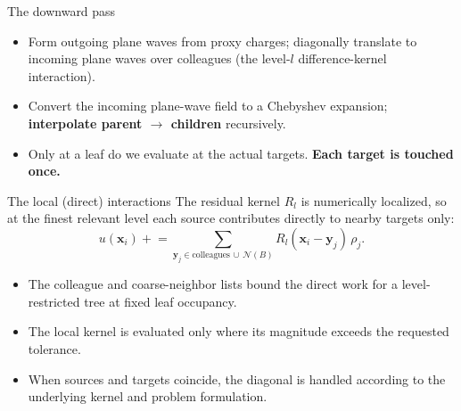 \documentclass[aspectratio=169,11pt]{beamer}
\newcommand{\cN}{\mathcal{N}}
\newcommand{\x}{\bm{x}}
\newcommand{\y}{\bm{y}}
\newcommand{\hl}[1]{{\color{CCMorange}\textbf{#1}}}
\begin{document}
\begin{frame}{The downward pass}
\small
\begin{center}
\end{center}
\begin{itemize}
  \item Form outgoing plane waves from proxy charges; diagonally translate to incoming plane waves over colleagues (the level-\(l\) difference-kernel interaction).
  \item Convert the incoming plane-wave field to a Chebyshev expansion; \hl{interpolate parent \(\to\) children} recursively.
  \item Only at a leaf do we evaluate at the actual targets. \hl{Each target is touched once.}
\end{itemize}
\end{frame}

\begin{frame}{The local (direct) interactions}
\small
The residual kernel \(R_l\) is numerically localized, so at the finest relevant level each source contributes directly to nearby targets only:
\[
  u(\x_i)\mathrel{+}=\sum_{\y_j\in \text{colleagues}\,\cup\,\cN(B)} R_l(\x_i-\y_j)\,\rho_j .
\]
\begin{itemize}
  \item The colleague and coarse-neighbor lists bound the direct work for a level-restricted tree at fixed leaf occupancy.
  \item The local kernel is evaluated only where its magnitude exceeds the requested tolerance.
  \item When sources and targets coincide, the diagonal is handled according to the underlying kernel and problem formulation.
\end{itemize}
\end{frame}
\end{document}
